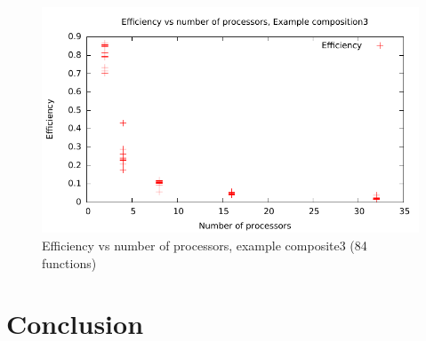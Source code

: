 \documentclass{acm_proc_article-sp}
\begin{document}
\begin{figure}[ht]
	\centering
	\includegraphics[scale=0.6]{../../data/composite3-efficiency.pdf}
	\caption{Efficiency vs number of processors, example composite3 (84
	functions)}
	\label{fig:c3e}
\end{figure}




%
%
%
%
%
%
%
%
%
%
\section{Conclusion}

\appendix
\end{document}
